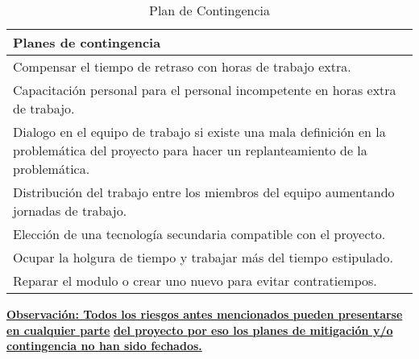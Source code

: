 \begin{table}[h]
	\begin{center}
		\begin{tabular}{|p{14.2cm}|}
			\hline \rowcolor[RGB]{51,153,255} 
				\textcolor{blanco}{\bf Planes de contingencia} \\
			\hline 
				Compensar el tiempo de retraso con horas de trabajo extra. \\
      		\hline \rowcolor[RGB]{240,248,255}
				Capacitación personal para el personal incompetente en horas extra de trabajo. \\
			\hline 
				Dialogo en el  equipo de trabajo si existe una mala definición en la problemática del proyecto para hacer un replanteamiento de la problemática. \\ 
			\hline \rowcolor[RGB]{240,248,255}
				Distribución del trabajo entre los miembros del equipo aumentando jornadas de trabajo. \\ 
			\hline 
				Elección de una tecnología secundaria compatible con el proyecto. \\ 
			\hline \rowcolor[RGB]{240,248,255}
				Ocupar la holgura de tiempo y trabajar más del tiempo estipulado. \\ 
			\hline
				Reparar el modulo o crear uno nuevo para evitar contratiempos. \\ 
			\hline
		\end{tabular}
	\end{center}
	\caption[Plan de Contingencia]{Plan de Contingencia} 
	\label{tab:planContingencia}
\end{table}

\begin{center}
	{\bf \underline{\small Observación: Todos los riesgos antes mencionados pueden presentarse en cualquier parte}}
	{\bf \underline{\small del proyecto por eso  los planes de mitigación y/o contingencia no han sido fechados.}}
\end{center} 